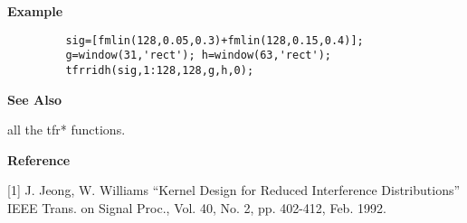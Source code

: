 \newpage

{\bf \large {}\selectfont Example}
\begin{verbatim}
         sig=[fmlin(128,0.05,0.3)+fmlin(128,0.15,0.4)];  
         g=window(31,'rect'); h=window(63,'rect');  
         tfrridh(sig,1:128,128,g,h,0);
\end{verbatim}
\vspace*{.5cm}


{\bf \large {}\selectfont See Also}\\
\hspace*{1.5cm}
\begin{minipage}[t]{13.5cm}
all the {\ty tfr*} functions.
\end{minipage}
\vspace*{.5cm}


{\bf \large {}\selectfont Reference}\\
\hspace*{1.5cm}
\begin{minipage}[t]{13.5cm}
[1] J. Jeong, W. Williams ``Kernel Design for Reduced Interference
Distributions'' IEEE Trans. on Signal Proc., Vol. 40, No. 2, pp. 402-412,
Feb. 1992.
\end{minipage}

